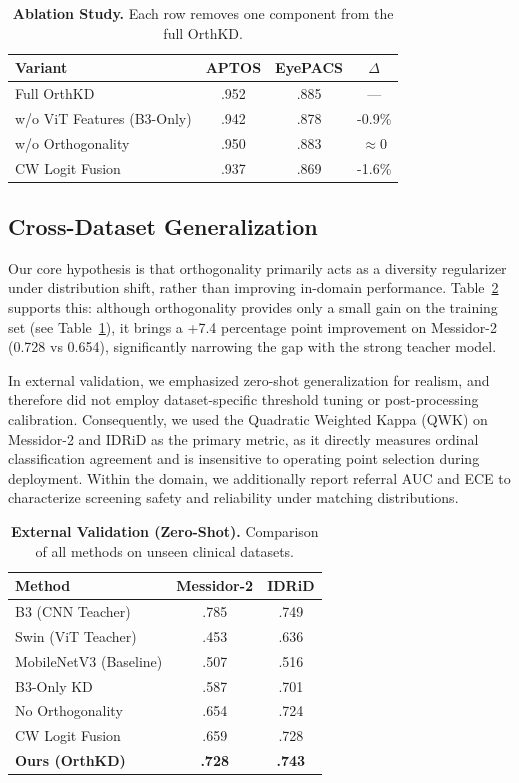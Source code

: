 \documentclass{article}
\begin{document}
\begin{table}[ht]
\centering
\caption{\textbf{Ablation Study.} Each row removes one component from the full OrthKD.}
\label{tab:ablation}
\small
\begin{tabular}{@{}lccc@{}}
\toprule
\textbf{Variant} & \textbf{APTOS} & \textbf{EyePACS} & \textbf{$\Delta$} \\
\midrule
Full OrthKD & .952 & .885 & — \\
	w/o ViT Features (B3-Only) & .942 & .878 & -0.9\% \\
	w/o Orthogonality & .950 & .883 & $\approx$0 \\
	CW Logit Fusion & .937 & .869 & -1.6\% \\
\bottomrule
\end{tabular}
\end{table}

\subsection{Cross-Dataset Generalization}

Our core hypothesis is that orthogonality primarily acts as a diversity regularizer under distribution shift, rather than improving in-domain performance. Table~\ref{tab:crossdataset} supports this: although orthogonality provides only a small gain on the training set (see Table~\ref{tab:ablation}), it brings a +7.4 percentage point improvement on Messidor-2 (0.728 vs 0.654), significantly narrowing the gap with the strong teacher model.

In external validation, we emphasized zero-shot generalization for realism, and therefore did not employ dataset-specific threshold tuning or post-processing calibration. Consequently, we used the Quadratic Weighted Kappa (QWK) on Messidor-2 and IDRiD as the primary metric, as it directly measures ordinal classification agreement and is insensitive to operating point selection during deployment. Within the domain, we additionally report referral AUC and ECE to characterize screening safety and reliability under matching distributions.

\begin{table}[ht]
\centering
\caption{\textbf{External Validation (Zero-Shot).} Comparison of all methods on unseen clinical datasets.}
\label{tab:crossdataset}
\small
\begin{tabular}{@{}lcc@{}}
\toprule
\textbf{Method} & \textbf{Messidor-2} & \textbf{IDRiD} \\
\midrule
B3 (CNN Teacher) & .785 & .749 \\
Swin (ViT Teacher) & .453 & .636 \\
MobileNetV3 (Baseline) & .507 & .516 \\
\midrule
B3-Only KD & .587 & .701 \\
No Orthogonality & .654 & .724 \\
CW Logit Fusion & .659 & .728 \\
\textbf{Ours (OrthKD)} & \textbf{.728} & \textbf{.743} \\
\bottomrule
\end{tabular}
\end{table}
\end{document}
